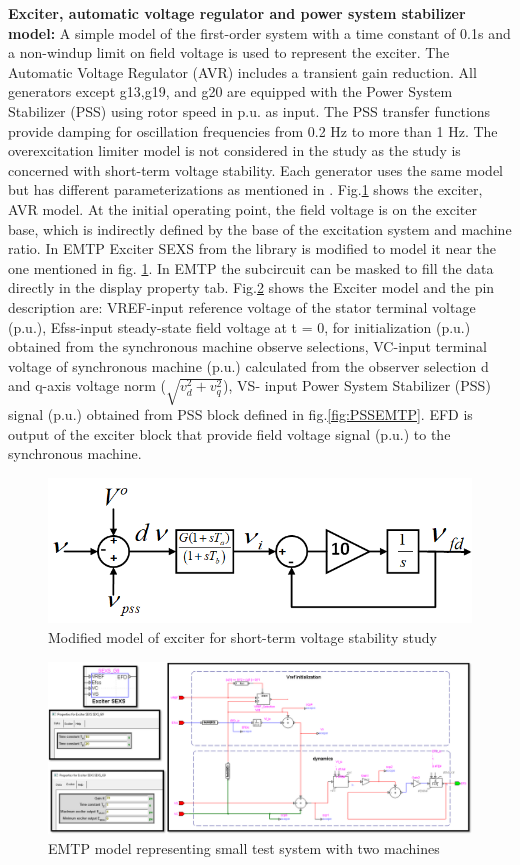 \documentclass{report}
\begin{document}
\textbf{Exciter, automatic voltage regulator and power system stabilizer model:}
A simple model of the first-order system with a time constant of 0.1s and a non-windup limit on field voltage is used to represent the exciter. The Automatic Voltage Regulator (AVR) includes a transient gain reduction. All generators except g13,g19, and g20 are equipped with the Power System Stabilizer (PSS) using rotor speed in p.u. as input. The PSS transfer functions provide damping for oscillation frequencies from 0.2 Hz to more than 1 Hz. The overexcitation limiter model is not considered in the study as the study is concerned with short-term voltage stability. Each generator uses the same model but has different parameterizations as mentioned in \cite{van2015test}. Fig.\ref{fig:exciter} shows the exciter, AVR model.  At the initial operating point, the field voltage is on the exciter base, which is indirectly defined by the base of the excitation system and machine ratio. In EMTP Exciter SEXS from the library is modified to model it near the one mentioned in fig. \ref{fig:exciter}. In EMTP the subcircuit can be masked to fill the data directly in the display property tab. Fig.\ref{fig:ExciterEMTP} shows the Exciter model and the pin description are: VREF-input reference voltage of the stator terminal voltage (p.u.), Efss-input steady-state field voltage at t = 0, for initialization (p.u.) obtained from the synchronous machine observe selections, VC-input terminal voltage of synchronous machine (p.u.) calculated from the observer selection d and q-axis voltage norm ($\sqrt{v_d^2+v_q^2}$), VS- input Power System Stabilizer (PSS) signal (p.u.) obtained from PSS block defined in fig.\ref{fig:PSSEMTP}. EFD is output of the exciter block that provide field voltage signal (p.u.) to the synchronous machine.  
\begin{figure}[H]
    \centering
    \includegraphics[width=0.7\linewidth]{Figure_Nordic/Exciter.png}
    \caption{Modified model of exciter for short-term voltage stability study}
    \label{fig:exciter}
\end{figure}
\begin{figure}
    \centering
    \includegraphics[width=1.0\linewidth]{Figure_Nordic/ExciterEMTP.png}
    \caption{EMTP model representing small test  system with two machines}
    \label{fig:ExciterEMTP}
\end{figure}
\end{document}
